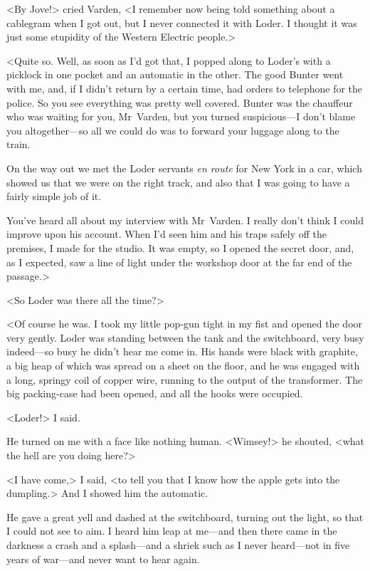 <By Jove!> cried Varden, <I remember now being told something about a cablegram when I got out, but I never connected it with Loder. I thought it was just some stupidity of the Western Electric people.>

<Quite so. Well, as soon as I'd got that, I popped along to Loder's with a picklock in one pocket and an automatic in the other. The good Bunter went with me, and, if I didn't return by a certain time, had orders to telephone for the police. So you see everything was pretty well covered. Bunter was the chauffeur who was waiting for you, Mr~Varden, but you turned suspicious—I don't blame you altogether—so all we could do was to forward your luggage along to the train.

On the way out we met the Loder servants \textit{en route} for New York in a car, which showed us that we were on the right track, and also that I was going to have a fairly simple job of it.

You've heard all about my interview with Mr~Varden. I really don't think I could improve upon his account. When I'd seen him and his traps safely off the premises, I made for the studio. It was empty, so I opened the secret door, and, as I expected, saw a line of light under the workshop door at the far end of the passage.>

<So Loder was there all the time?>

<Of course he was. I took my little pop-gun tight in my fist and opened the door very gently. Loder was standing between the tank and the switchboard, very busy indeed—so busy he didn't hear me come in. His hands were black with graphite, a big heap of which was spread on a sheet on the floor, and he was engaged with a long, springy coil of copper wire, running to the output of the transformer. The big packing-case had been opened, and all the hooks were occupied.

<Loder!> I said.

He turned on me with a face like nothing human. <Wimsey!> he shouted, <what the hell are you doing here?>

<I have come,> I said, <to tell you that I know how the apple gets into the dumpling.> And I showed him the automatic.

He gave a great yell and dashed at the switchboard, turning out the light, so that I could not see to aim. I heard him leap at me—and then there came in the darkness a crash and a splash—and a shriek such as I never heard—not in five years of war—and never want to hear again.

